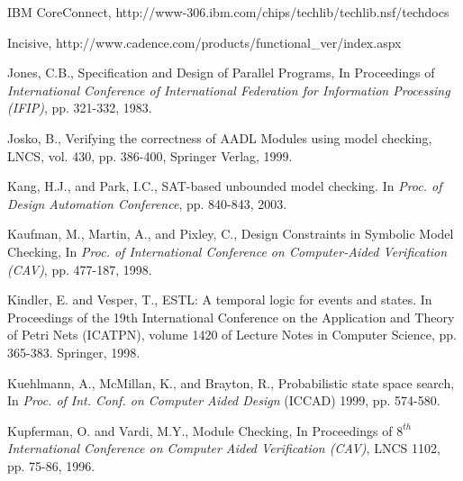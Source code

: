{\begin{thebibliography}{99}
 IBM CoreConnect, 
	http://www-306.ibm.com/chips/techlib/techlib.nsf/techdocs

 Incisive, 
        http://www.cadence.com/products/functional\_ver/index.aspx

 Jones, C.B., Specification and Design of Parallel Programs,
        In Proceedings of {\em International Conference of International
        Federation for Information Processing (IFIP)}, pp. 321-332,
        1983.

 Josko, B., Verifying the correctness of AADL Modules using
        model checking, LNCS, vol. 430, pp. 386-400, Springer Verlag, 1999.

 Kang, H.J., and Park, I.C., SAT-based unbounded model
	checking. In {\em Proc. of Design Automation Conference}, pp. 840-843,
	2003.

 Kaufman, M., Martin, A., and Pixley, C.,
        Design Constraints in Symbolic Model Checking,
        In {\em Proc. of International Conference on Computer-Aided 
	    Verification (CAV)}, pp. 477-187, 1998. 

 Kindler, E. and Vesper, T., ESTL: A temporal logic for events
    and states. In Proceedings of the 19th International Conference on the
    Application and Theory of Petri Nets (ICATPN), volume 1420 of Lecture
    Notes in Computer Science, pp. 365-383. Springer, 1998. 

 Kuehlmann, A., McMillan, K., and Brayton, R.,
        Probabilistic state space search, 
	In {\em Proc. of Int. Conf. on Computer
	Aided Design} (ICCAD) 1999, pp. 574-580.

 Kupferman, O. and Vardi, M.Y., Module Checking, In
        Proceedings of {\em $8^{th}$ International Conference on 
	Computer Aided Verification (CAV)}, LNCS 1102, pp. 75-86, 1996.





\end{thebibliography}}
